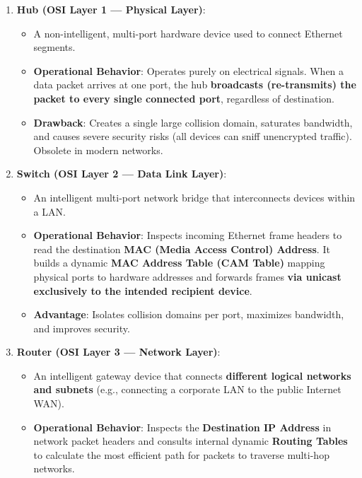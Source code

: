 \begin{enumerate}[leftmargin=1.5em]
    \item \textbf{Hub (OSI Layer 1 --- Physical Layer)}:
    \begin{itemize}
        \item A non-intelligent, multi-port hardware device used to connect Ethernet segments.
        \item \textbf{Operational Behavior}: Operates purely on electrical signals. When a data packet arrives at one port, the hub \textbf{broadcasts (re-transmits) the packet to every single connected port}, regardless of destination.
        \item \textbf{Drawback}: Creates a single large collision domain, saturates bandwidth, and causes severe security risks (all devices can sniff unencrypted traffic). Obsolete in modern networks.
    \end{itemize}

    \item \textbf{Switch (OSI Layer 2 --- Data Link Layer)}:
    \begin{itemize}
        \item An intelligent multi-port network bridge that interconnects devices within a LAN.
        \item \textbf{Operational Behavior}: Inspects incoming Ethernet frame headers to read the destination \textbf{MAC (Media Access Control) Address}. It builds a dynamic \textbf{MAC Address Table (CAM Table)} mapping physical ports to hardware addresses and forwards frames \textbf{via unicast exclusively to the intended recipient device}.
        \item \textbf{Advantage}: Isolates collision domains per port, maximizes bandwidth, and improves security.
    \end{itemize}

    \item \textbf{Router (OSI Layer 3 --- Network Layer)}:
    \begin{itemize}
        \item An intelligent gateway device that connects \textbf{different logical networks and subnets} (e.g., connecting a corporate LAN to the public Internet WAN).
        \item \textbf{Operational Behavior}: Inspects the \textbf{Destination IP Address} in network packet headers and consults internal dynamic \textbf{Routing Tables} to calculate the most efficient path for packets to traverse multi-hop networks.
    \end{itemize}


\end{enumerate}
